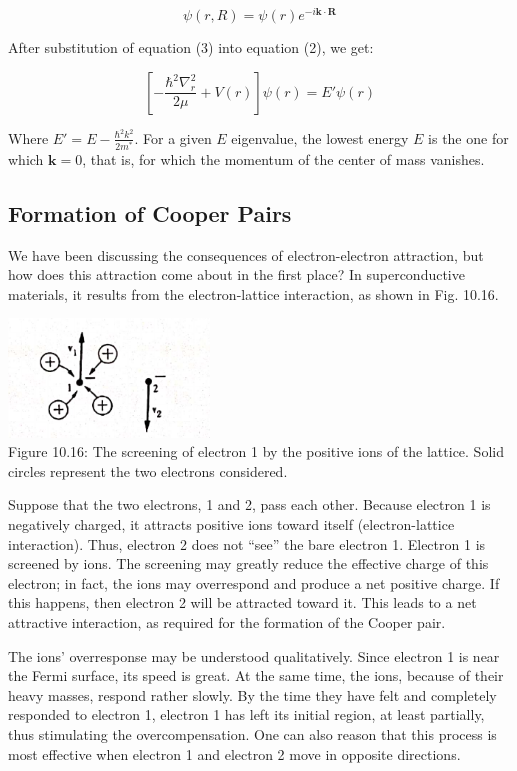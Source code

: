 \documentclass{article}
\begin{document}
\[
\psi(r, R) = \psi(r) e^{-i\mathbf{k} \cdot \mathbf{R}} \tag{3}
\]

After substitution of equation (3) into equation (2), we get:

\[
\left[ -\frac{\hbar^2 \nabla_{r}^2}{2\mu} + V(r) \right] \psi(r) = E' \psi(r) \tag{4}
\]

Where $E' = E - \frac{\hbar^2 k^2}{2m^*}$. For a given $E$ eigenvalue, the lowest energy $E$ is the one for which $\mathbf{k} = 0$, that is, for which the momentum of the center of mass vanishes.

\subsection{Formation of Cooper Pairs}

We have been discussing the consequences of electron-electron attraction, but how does this attraction come about in the first place? In superconductive materials, it results from the electron-lattice interaction, as shown in Fig. 10.16.

\begin{center}
    \includegraphics[width=0.4\textwidth]{figures/electron_lattice_interaction.png} \\
    Figure 10.16: The screening of electron 1 by the positive ions of the lattice. Solid circles represent the two electrons considered.
\end{center}

Suppose that the two electrons, 1 and 2, pass each other. Because electron 1 is negatively charged, it attracts positive ions toward itself (electron-lattice interaction). Thus, electron 2 does not “see” the bare electron 1. Electron 1 is screened by ions. The screening may greatly reduce the effective charge of this electron; in fact, the ions may overrespond and produce a net positive charge. If this happens, then electron 2 will be attracted toward it. This leads to a net attractive interaction, as required for the formation of the Cooper pair.

The ions' overresponse may be understood qualitatively. Since electron 1 is near the Fermi surface, its speed is great. At the same time, the ions, because of their heavy masses, respond rather slowly. By the time they have felt and completely responded to electron 1, electron 1 has left its initial region, at least partially, thus stimulating the overcompensation. One can also reason that this process is most effective when electron 1 and electron 2 move in opposite directions.
\end{document}
